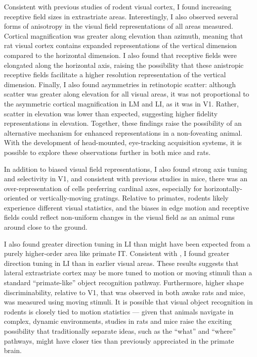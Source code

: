 Consistent with previous studies of rodent visual cortex, I found increasing receptive field sizes in extrastriate areas. Interestingly, I also observed several forms of anisotropy in the visual field representations of all areas measured. Cortical magnification was greater along elevation than azimuth, meaning that rat visual cortex contains expanded representations of the vertical dimension compared to the horizontal dimension. I also found that receptive fields were elongated along the horizontal axis, raising the possibility that these anistropic receptive fields facilitate a higher resolution representation of the vertical dimension. Finally, I also found asymmetries in retinotopic scatter: although scatter was greater along elevation for all visual areas, it was not proportional to the asymmetric cortical magnification in LM and LI, as it was in V1. Rather, scatter in elevation was lower than expected, suggesting higher fidelity representations in elevation. Together, these findings raise the possibility of an alternative mechanism for enhanced representations in a non-foveating animal. With the development of head-mounted, eye-tracking acquisition systems\cite{Meyer2020, Michaiel2020}, it is possible to explore these observations further in both mice and rats. 

In addition to biased visual field representations, I also found strong axis tuning and selectivity in V1, and consistent with previous studies in mice, there was an over-representation of cells preferring cardinal axes, especially for horizontally-oriented or vertically-moving gratings. Relative to primates, rodents likely experience different visual statistics, and the biases in edge motion and receptive fields could reflect non-uniform changes in the visual field as an animal runs around close to the ground. 

I also found greater direction tuning in LI than might have been expected from a purely higher-order area like primate IT. Consistent with \citet{Vermaercke2014}, I found greater direction tuning in LI than in earlier visual areas. These results suggests that lateral extrastriate cortex may be more tuned to motion or moving stimuli than a standard ``primate-like'' object recognition pathway. Furthermore, higher shape discriminability, relative to V1, that was observed in both awake rats\cite{Vermaercke2014} and mice\cite{Froudarakis2020}, was measured using moving stimuli. It is possible that visual object recognition in rodents is closely tied to motion statistics --- given that animals navigate in complex, dynamic environments, studies in rats and mice raise the exciting possibility that traditionally separate ideas, such as the ``what'' and ``where'' pathways, might have closer ties than previously appreciated in the primate brain. 

